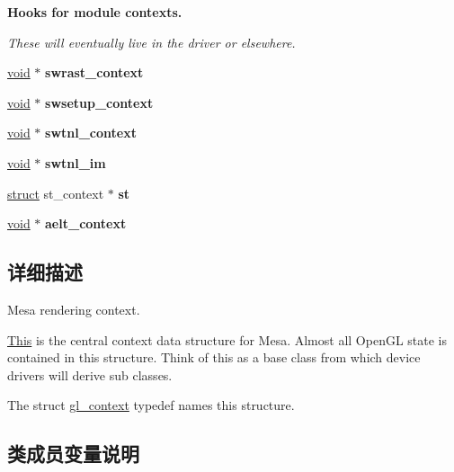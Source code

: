 \begin{Indent}\textbf{ Hooks for module contexts.}\par
{\em These will eventually live in the driver or elsewhere. }\begin{DoxyCompactItemize}
\item 
\mbox{\label{structgl__context_aa32345d15fa965f5750d8a5ef6b49867}} 
\hyperlink{interfacevoid}{void} $\ast$ {\bfseries swrast\+\_\+context}
\item 
\mbox{\label{structgl__context_aa612fa4448c0abd6040cedbf73add049}} 
\hyperlink{interfacevoid}{void} $\ast$ {\bfseries swsetup\+\_\+context}
\item 
\mbox{\label{structgl__context_a66f2ec34dd7131597e20504fcd7a2d3a}} 
\hyperlink{interfacevoid}{void} $\ast$ {\bfseries swtnl\+\_\+context}
\item 
\mbox{\label{structgl__context_ade4d57c00f901b632bd770d273031e6f}} 
\hyperlink{interfacevoid}{void} $\ast$ {\bfseries swtnl\+\_\+im}
\item 
\mbox{\label{structgl__context_aa8f7ae78aec40ec3d532b9ea1f7306c2}} 
\hyperlink{interfacestruct}{struct} st\+\_\+context $\ast$ {\bfseries st}
\item 
\mbox{\label{structgl__context_aba1bd701a6569061a6d9847f2186ae78}} 
\hyperlink{interfacevoid}{void} $\ast$ {\bfseries aelt\+\_\+context}
\end{DoxyCompactItemize}
\end{Indent}


\subsection{详细描述}
Mesa rendering context.

\hyperlink{namespace_this}{This} is the central context data structure for Mesa. Almost all Open\+GL state is contained in this structure. Think of this as a base class from which device drivers will derive sub classes.

The struct \hyperlink{structgl__context}{gl\+\_\+context} typedef names this structure. 

\subsection{类成员变量说明}
\mbox{\label{structgl__context_a864d2d1285eb6fc23f92f7f6cd14336d}} 
